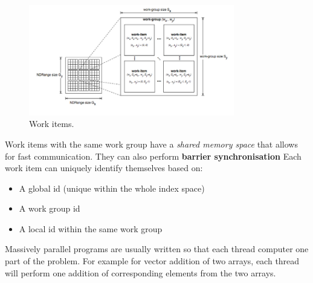\documentclass[11pt]{article}
\begin{document}
\begin{figure}[H]
\centering
\includegraphics[width=0.8\textwidth, keepaspectratio]{imgs/work-items.png}
\caption{Work items.}
\end{figure}
\noindent
Work items with the same work group have a \textit{shared memory space} that allows for fast communication. They can also perform \textbf{barrier synchronisation}  Each work item can uniquely identify themselves based on:
\begin{itemize}
\item A global id (unique within the whole index space)
\item A work group id 
\item A local id within the same work group
\end{itemize}
Massively parallel programs are usually written so that each thread computer one part of the problem. For example for vector addition of two arrays, each thread will perform one addition of corresponding elements from the two arrays. 
\end{document}
